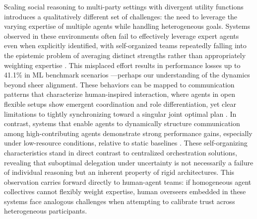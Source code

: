 \documentclass[11pt,a4paper]{article}
\begin{document}
Scaling social reasoning to multi-party settings with divergent utility functions introduces a qualitatively different set of challenges: the need to leverage the varying expertise of multiple agents while handling heterogeneous goals. Systems observed in these environments often fail to effectively leverage expert agents even when explicitly identified, with self-organized teams repeatedly falling into the epistemic problem of averaging distinct strengths rather than appropriately weighting expertise \cite{arxiv:2602.01011v4}. This misplaced effort results in performance losses up to 41.1\% in ML benchmark scenarios \cite{arxiv:2602.01011v4}---perhaps our understanding of the dynamics beyond sheer alignment. These behaviors can be mapped to communication patterns that characterize human-inspired interaction, where agents in open flexible setups show emergent coordination and role differentiation, yet clear limitations to tightly synchronizing toward a singular joint optimal plan \cite{arxiv:2510.05174v4}. In contrast, systems that enable agents to dynamically structure communication among high-contributing agents demonstrate strong performance gains, especially under low-resource conditions, relative to static baselines \cite{arxiv:2510.00685v2}. These self-organizing characteristics stand in direct contrast to centralized orchestration solutions, revealing that suboptimal delegation under uncertainty is not necessarily a failure of individual reasoning but an inherent property of rigid architectures. This observation carries forward directly to human-agent teams: if homogeneous agent collectives cannot flexibly weight expertise, human overseers embedded in these systems face analogous challenges when attempting to calibrate trust across heterogeneous participants.
\end{document}
